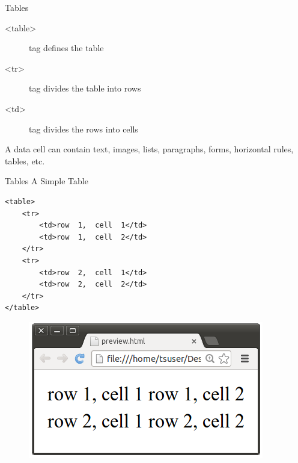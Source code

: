 \documentclass[14pt]{beamer}
\begin{document}
\begin{frame}{Tables}
 \begin{description}
  \item [<table>] tag defines the table
  \item [<tr>] tag divides the table into rows
  \item [<td>] tag divides the rows into cells
 \end{description}
 A data cell can contain text, images, lists, paragraphs, forms, horizontal rules, tables, etc.
\end{frame}

\begin{frame}[fragile]{Tables}
 A Simple Table
 
 \begin{minipage}{6cm}
  \begin{lstlisting}
<table>
    <tr>
        <td>row  1,  cell  1</td>
        <td>row  1,  cell  2</td>
    </tr>
    <tr>
        <td>row  2,  cell  1</td>
        <td>row  2,  cell  2</td>
    </tr>
</table>

\end{lstlisting}
\end{minipage}
\quad
\begin{minipage}{3cm}
 \begin{figure}[H]
  \includegraphics[scale=.3]{s02-tables-ex.png}
 \end{figure}
\end{minipage}
\end{frame}
\end{document}
